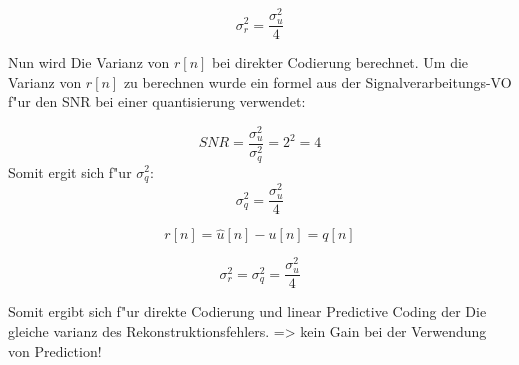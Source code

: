 \begin{equation}
 \sigma_r^2 = \frac{\sigma_u^2}{4}
\end{equation}

Nun wird Die Varianz von $r[n]$ bei direkter Codierung berechnet.
Um die Varianz von $r[n]$ zu berechnen wurde ein formel aus der Signalverarbeitungs-VO f"ur den SNR
bei einer quantisierung verwendet:

\begin{equation}
 SNR = \frac{\sigma_u^2}{\sigma_q^2} = 2^2 = 4
\end{equation}
Somit ergit sich f"ur $\sigma_q^2$:
\begin{equation}
 \sigma_q^2 = \frac{\sigma_u^2}{4}
\end{equation}

\begin{equation}
 r[n] = \hat{u}[n] - u[n] = q[n]
\end{equation}

\begin{equation}
 \sigma_r^2 = \sigma_q^2 = \frac{\sigma_u^2}{4}
\end{equation}

Somit ergibt sich f"ur direkte Codierung und linear Predictive Coding der Die gleiche varianz
des Rekonstruktionsfehlers. => kein Gain bei der Verwendung von Prediction!










